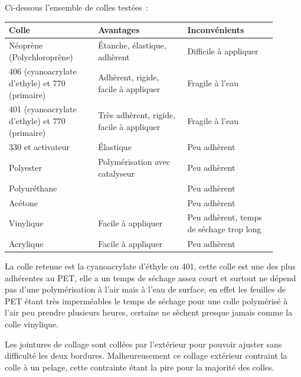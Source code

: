\documentclass[a4paper,11pt]{article}
\begin{document}
Ci-dessous l'ensemble de colles testées~:

\begin{center}
  \begin{tabular}{|p{0.3\linewidth}|p{0.3\linewidth}|p{0.3\linewidth}|}
		\hline
		Colle & Avantages & Inconvénients \\
		\hline

		\rowcolor{OrangeT}
		Néoprène (Polychloroprène) &
		Étanche, élastique, adhèrent &
		Difficile à appliquer \\
		\hline

		\rowcolor{OrangeT}
		406 (cyanoacrylate d'ethyle) et 770 (primaire) &
		Adhèrent, rigide, facile à appliquer &
		Fragile à l'eau \\
		\hline

		\rowcolor{GreenT}
		401 (cyanoacrylate d'ethyle) et 770 (primaire) &
		Très adhèrent, rigide, facile à appliquer &
		Fragile à l'eau \\
		\hline

		\rowcolor{RedT}
		330 et activateur &
		Élastique &
		Peu adhèrent \\
		\hline

		\rowcolor{RedT}
		Polyester &
		Polymérisation avec catalyseur &
		Peu adhèrent \\
		\hline

		\rowcolor{RedT}
		Polyuréthane &
		& Peu adhèrent \\
		\hline

		\rowcolor{RedT}
		Acétone &
		& Peu adhèrent \\
		\hline

		\rowcolor{RedT}
		Vinylique &
		Facile à appliquer &
		Peu adhèrent, temps de séchage trop long \\
		\hline

		\rowcolor{RedT}
		Acrylique &
		Facile à appliquer &
		Peu adhèrent \\
		\hline
  \end{tabular}
\end{center}

La colle retenue est la cyanoacrylate d'éthyle ou 401, cette colle est une des plus adhérentes au PET, elle a un temps de séchage assez court et surtout ne dépend pas d'une polymérisation à l'air mais à l'eau de surface, en effet les feuilles de PET étant très imperméables le temps de séchage pour une colle polymérisé à l'air peu prendre plusieurs heures, certaine ne sèchent presque jamais comme la colle vinylique.

Les jointures de collage sont collées par l'extérieur pour pouvoir ajuster sans difficulté les deux bordures. Malheureusement ce collage extérieur contraint la colle à un pelage, cette contrainte étant la pire pour la majorité des colles.
\end{document}
